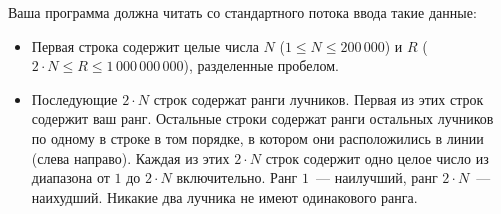 Ваша программа должна читать со стандартного потока ввода такие данные:
\begin{itemize}
\item Первая строка содержит целые числа $N$ ($1 \le N \le 200\,000$) и $R$ ($2 \cdot N \le R \le 1\,000\,000\,000$), разделенные пробелом.
\item Последующие $2 \cdot N$ строк содержат ранги лучников. Первая из этих строк содержит ваш ранг. Остальные строки содержат ранги остальных лучников по одному в строке в том порядке, в котором они расположились в линии (слева направо). Каждая из этих $2 \cdot N$ строк содержит одно целое число из диапазона от $1$ до $2 \cdot N$ включительно. Ранг $1$~--- наилучший, ранг $2 \cdot N$~--- наихудший. Никакие два лучника не имеют одинакового ранга.
\end{itemize}
